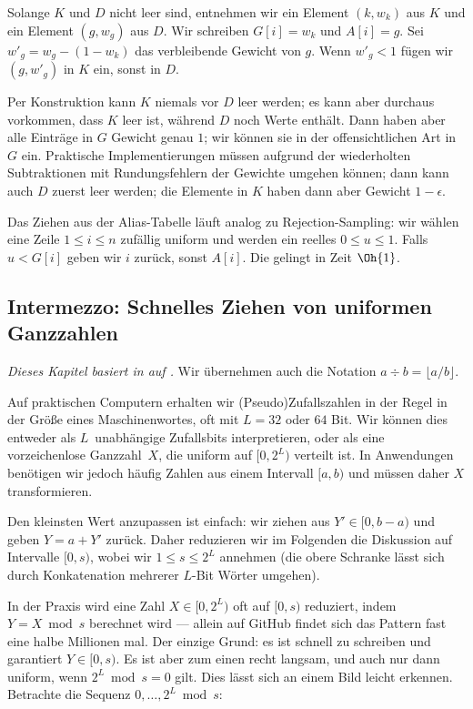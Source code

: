 Solange $K$ und $D$ nicht leer sind, entnehmen wir ein Element $(k, w_k)$ aus $K$ und ein Element $(g, w_g)$ aus $D$.
Wir schreiben $G[i] = w_k$ und $A[i] = g$.
Sei $w'_g = w_g - (1 - w_k)$ das verbleibende Gewicht von $g$.
Wenn $w'_g < 1$ fügen wir $(g, w'_g)$ in $K$ ein, sonst in $D$.

Per Konstruktion kann $K$ niemals vor $D$ leer werden; es kann aber durchaus vorkommen, dass $K$ leer ist, während $D$ noch Werte enthält.
Dann haben aber alle Einträge in $G$ Gewicht genau $1$; wir können sie in der offensichtlichen Art in $G$ ein.
Praktische Implementierungen müssen aufgrund der wiederholten Subtraktionen mit Rundungsfehlern der Gewichte umgehen können;
dann kann auch $D$ zuerst leer werden; die Elemente in $K$ haben dann aber Gewicht $1 - \epsilon$.

Das Ziehen aus der Alias-Tabelle läuft analog zu Rejection-Sampling:
wir wählen eine Zeile $1 \le i \le n$ zufällig uniform und werden ein reelles $0 \le u \le 1$.
Falls $u < G[i]$ geben wir $i$ zurück, sonst $A[i]$.
Die gelingt in Zeit $\Oh{1}$.

\subsection{Intermezzo: Schnelles Ziehen von uniformen Ganzzahlen}\label{subsec:uniforme_ganzzahlen}
\emph{Dieses Kapitel basiert in auf \cite{DBLP:journals/tomacs/Lemire19}.}
Wir übernehmen auch die Notation $a \div b = \lfloor a / b \rfloor$.

\bigskip

Auf praktischen Computern erhalten wir (Pseudo)Zufallszahlen in der Regel in der Größe eines Maschinenwortes, oft mit $L = 32$ oder $64$ Bit.
Wir können dies entweder als $L$~unabhängige Zufallsbits interpretieren, oder \zB als eine vorzeichenlose Ganzzahl~$X$, die uniform auf $[0, 2^L)$ verteilt ist.
In Anwendungen benötigen wir jedoch häufig Zahlen aus einem Intervall $[a, b)$ und müssen daher $X$ transformieren.

Den kleinsten Wert anzupassen ist einfach: wir ziehen aus $Y' \in [0, b-a)$ und geben $Y = a + Y'$ zurück.
Daher reduzieren wir im Folgenden die Diskussion auf Intervalle $[0, s)$, wobei wir $1 \le s \le 2^L$ annehmen (die obere Schranke lässt sich durch Konkatenation mehrerer $L$-Bit Wörter umgehen).

In der Praxis wird eine Zahl $X \in [0, 2^L)$ oft auf $[0, s)$ reduziert, indem $Y = X \bmod s$ berechnet wird
--- allein auf GitHub findet sich das Pattern  fast eine halbe Millionen mal.
Der einzige Grund: es ist schnell zu schreiben und garantiert $Y \in [0, s)$.
Es ist aber zum einen recht langsam, und auch nur dann uniform, wenn $2^L \bmod s = 0$ gilt.
Dies lässt sich an einem Bild leicht erkennen.
Betrachte die Sequenz $0, \ldots, 2^L \bmod s$:


